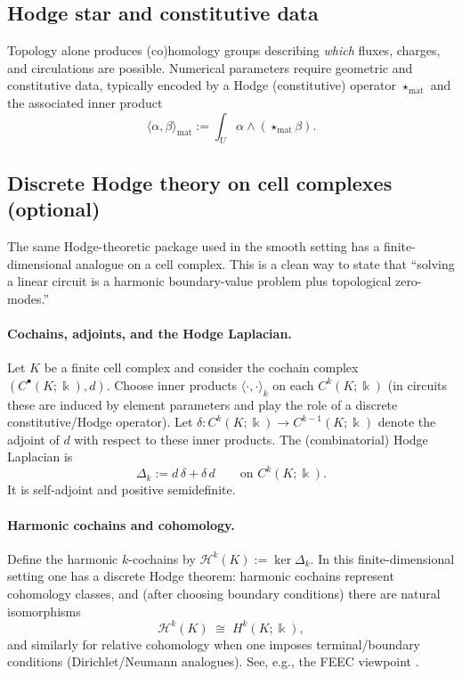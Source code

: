 \documentclass[11pt]{article}
\begin{document}
\subsection{Hodge star and constitutive data}
Topology alone produces (co)homology groups describing \emph{which} fluxes, charges, and circulations are possible.
Numerical parameters require geometric and constitutive data, typically encoded by a Hodge (constitutive) operator $\star_{\mathrm{mat}}$ and the associated inner product
\[
\langle \alpha,\beta\rangle_{\mathrm{mat}}:=\int_U \alpha\wedge (\star_{\mathrm{mat}}\beta).
\]

\subsection{Discrete Hodge theory on cell complexes (optional)}
\label{sec:discrete-hodge}
The same Hodge-theoretic package used in the smooth setting has a finite-dimensional analogue on a cell complex.
This is a clean way to state that ``solving a linear circuit is a harmonic boundary-value problem plus topological zero-modes.''

\paragraph{Cochains, adjoints, and the Hodge Laplacian.}
Let $K$ be a finite cell complex and consider the cochain complex $(C^\bullet(K;\Bbbk),d)$.
Choose inner products $\langle\cdot,\cdot\rangle_k$ on each $C^k(K;\Bbbk)$ (in circuits these are induced by element parameters and play the role of a discrete constitutive/Hodge operator).
Let $\delta\colon C^{k}(K;\Bbbk)\to C^{k-1}(K;\Bbbk)$ denote the adjoint of $d$ with respect to these inner products.
The (combinatorial) Hodge Laplacian is
\[
\Delta_k := d\,\delta + \delta\,d\qquad\text{on }C^{k}(K;\Bbbk).
\]
It is self-adjoint and positive semidefinite.

\paragraph{Harmonic cochains and cohomology.}
Define the harmonic $k$-cochains by $\mathcal{H}^k(K):=\ker \Delta_k$.
In this finite-dimensional setting one has a discrete Hodge theorem: harmonic cochains represent cohomology classes, and (after choosing boundary conditions) there are natural isomorphisms
\[
\mathcal{H}^k(K)\;\cong\; H^k(K;\Bbbk),
\]
and similarly for relative cohomology when one imposes terminal/boundary conditions (Dirichlet/Neumann analogues).
See, e.g., the FEEC viewpoint \cite{arnold_falk_winther_2010_feec}.
\end{document}
